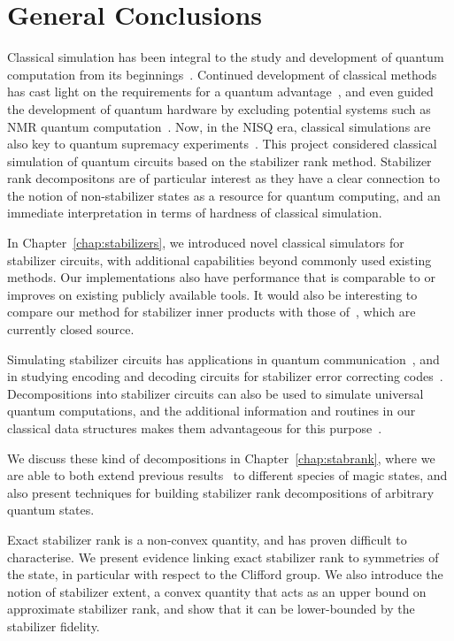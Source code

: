 
\chapter{General Conclusions}
\label{chap:conclusion}
Classical simulation has been integral to the study and development of quantum computation from its beginnings~\cite{Feynman1982}. Continued development of classical methods has cast light on the requirements for a quantum advantage~\cite{Jozsa2003}, and even guided the development of quantum hardware by excluding potential systems such as NMR quantum computation~\cite{Braunstein1999}. Now, in the NISQ era, classical simulations are also key to quantum supremacy experiments~\cite{Preskill2012,Aaronson2016}. This project considered classical simulation of quantum circuits based on the stabilizer rank method. Stabilizer rank decompositons are of particular interest as they have a clear connection to the notion of non-stabilizer states as a resource for quantum computing, and an immediate interpretation in terms of hardness of classical simulation.\par
In Chapter~\ref{chap:stabilizers}, we introduced novel classical simulators for stabilizer circuits, with additional capabilities beyond commonly used existing methods. Our implementations also have performance that is comparable to or improves on existing publicly available tools. It would also be interesting to compare our method for stabilizer inner products with those of~\cite{Garcia2012}, which are currently closed source.\par
Simulating stabilizer circuits has applications in quantum communication~\cite{Bennett1992,Bennett1993}, and in studying encoding and decoding circuits for stabilizer error correcting codes~\cite{Aaronson2004,Gottesman1997}. Decompositions into stabilizer circuits can also be used to simulate universal quantum computations, and the additional information and routines in our classical data structures makes them advantageous for this purpose~\cite{Bravyi2018}.\par
We discuss these kind of decompositions in Chapter~\ref{chap:stabrank}, where we are able to both extend previous results~\cite{Bravyi2016,Bravyi2015} to different species of magic states, and also present techniques for building stabilizer rank decompositions of arbitrary quantum states.\par
Exact stabilizer rank is a non-convex quantity, and has proven difficult to characterise. We present evidence linking exact stabilizer rank to symmetries of the state, in particular with respect to the Clifford group. We also introduce the notion of stabilizer extent, a convex quantity that acts as an upper bound on approximate stabilizer rank, and show that it can be lower-bounded by the stabilizer fidelity.\par
